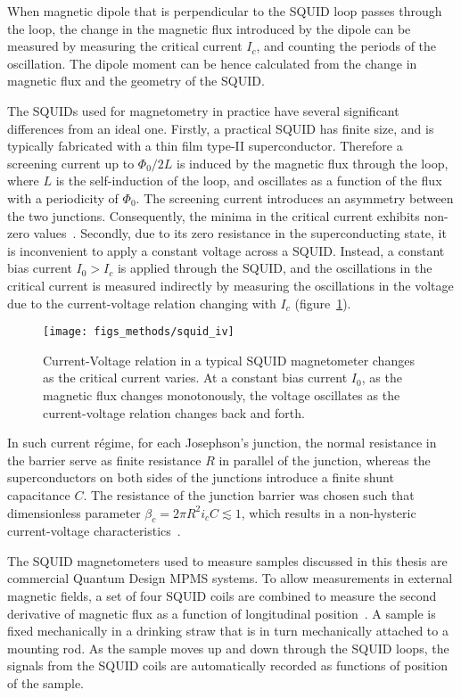 When magnetic dipole that is perpendicular to the SQUID loop passes through the loop, the change in the magnetic flux introduced by the dipole can be measured by measuring the critical current $I_c$, and counting the periods of the oscillation. The dipole moment can be hence calculated from the change in magnetic flux and the geometry of the SQUID.

The SQUIDs used for magnetometry in practice have several significant differences from an ideal one. Firstly, a practical SQUID has finite size, and is typically fabricated with a thin film type-II superconductor. Therefore a screening current up to $\Phi_0 / 2L$ is induced by the magnetic flux through the loop, where $L$ is the self-induction of the loop, and oscillates as a function of the flux with a periodicity of $\Phi_0$. The screening current introduces an asymmetry between the two junctions. Consequently, the minima in the critical current exhibits non-zero values~\cite{Clarke1976}. Secondly, due to its zero resistance in the superconducting state, it is inconvenient to apply a constant voltage across a SQUID. Instead, a constant bias current $I_0 > I_c$ is applied through the SQUID, and the oscillations in the critical current is measured indirectly by measuring the oscillations in the voltage due to the current-voltage relation changing with $I_c$ (figure~\ref{fig:squid_iv}). %
\begin{figure}[ht]%
	\centering%
    \texttt{[image: figs\_methods/squid\_iv]}%
    \caption[Current-Voltage relation in a SQUID magnetometer]{\label{fig:squid_iv}Current-Voltage relation in a typical SQUID magnetometer changes as the critical current varies. At a constant bias current $I_0$, as the magnetic flux changes monotonously, the voltage oscillates as the current-voltage relation changes back and forth.}%
\end{figure}%
In such current r\'egime, for each Josephson's junction, the normal resistance in the barrier serve as finite resistance $R$ in parallel of the junction, whereas the superconductors on both sides of the junctions introduce a finite shunt capacitance $C$. The resistance of the junction barrier was chosen such that dimensionless parameter $\beta_c = 2\pi{}R^2i_cC \lesssim 1$, which results in a non-hysteric current-voltage characteristics~\cite{Hansma1971}.

The SQUID magnetometers used to measure samples discussed in this thesis are commercial Quantum Design MPMS systems. To allow measurements in external magnetic fields, a set of four SQUID coils are combined to measure the second derivative of magnetic flux as a function of longitudinal position~\cite{mpms_hardware}. A sample is fixed mechanically in a drinking straw that is in turn mechanically attached to a mounting rod. As the sample moves up and down through the SQUID loops, the signals from the SQUID coils are automatically recorded as functions of position of the sample.

